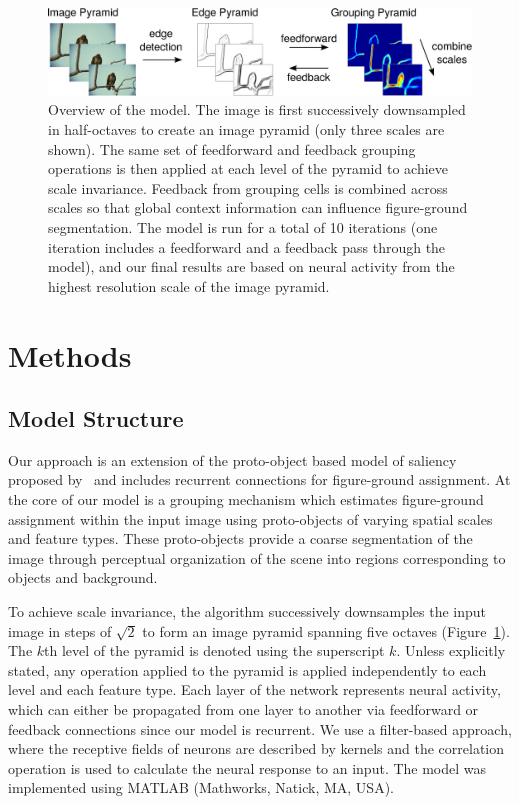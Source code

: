 \begin{figure}[t!]
\centering
\includegraphics[width=\textwidth]{NaturalImage/figs/model_scheme_new.eps}
\makeatletter
\let\@currsize\normalsize
\caption[Overview of the model for figure-ground organization of natural scenes]{Overview of the model. The image is first successively downsampled in half-octaves to create an image pyramid (only three scales are shown). The same set of feedforward and feedback grouping operations is then applied at each level of the pyramid to achieve scale invariance. Feedback from grouping cells is combined across scales so that global context information can influence figure-ground segmentation. The model is run for a total of 10 iterations (one iteration includes a feedforward and a feedback pass through the model), and our final results are based on neural activity from the highest resolution scale of the image pyramid.}
\label{Fig:model_overview}
\end{figure}

\section{Methods} 
\label{sec:model}
\subsection{Model Structure}

Our approach is an extension of the proto-object based model of saliency proposed by~\cite{Russell_etal14} and includes recurrent connections for figure-ground assignment. At the core of our model is a grouping mechanism which estimates figure-ground assignment within the input image using proto-objects of varying spatial scales and feature types. These proto-objects provide a coarse segmentation of the image through perceptual organization of the scene into regions corresponding to objects and background.
 
To achieve scale invariance, the algorithm successively downsamples the input image in steps of $\sqrt2$ to form an image pyramid spanning five octaves (Figure~\ref{Fig:model_overview}). The $k$th level of the pyramid is denoted using the superscript $k$. Unless explicitly stated, any operation applied to the pyramid is applied independently to each level and each feature type. Each layer of the network represents neural activity, which can either be propagated from one layer to another via feedforward or feedback connections since our model is recurrent. We use a filter-based approach, where the receptive fields of neurons are described by kernels and the correlation operation is used to calculate the neural response to an input. The model was implemented using MATLAB (Mathworks, Natick, MA,
USA).

